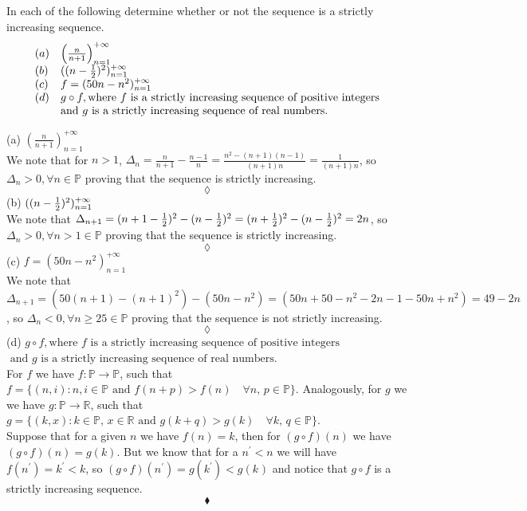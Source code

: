 \subsection{}
\begin{tcolorbox}
 In each of the following determine whether or not the sequence is a strictly increasing sequence.
\begin{align*}
\begin{array}{ll}
 (a)&\left(\frac{n}{n+1}\right)^{+\infty}_{n=1} \\
 (b) &((n -\frac{1}{2})^2)^{+\infty}_{n=1} \\
 (c)&f = (50n - n^2)^{+\infty}_{n=1} \\
 (d) &g \circ f, \text{where }f \text{ is a strictly increasing sequence of positive integers}\\
 &\text{and } g \text{ is a strictly increasing sequence of real numbers}. 
\end{array}
\end{align*}
\end{tcolorbox}
$$ $$
(a) $\left(\frac{n}{n+1}\right)^{+\infty}_{n=1}$ \\
We note that for $n>1$,  $\Delta_n= \frac{n}{n+1}- \frac{n-1}{n}= \frac{n^2-(n+1)(n-1)}{(n+1)n}= \frac{1}{(n+1)n}$, so $\Delta_n >0, \forall  n \in\mathbb{P}$ proving that the sequence is strictly increasing.
$$\lozenge$$
(b) $((n -\frac{1}{2})^2)^{+\infty}_{n=1}$ \\
We note that $\Delta_{n+1}= (n+1  -\frac{1}{2})^2- (n -\frac{1}{2})^2= (n  +\frac{1}{2})^2- (n -\frac{1}{2})^2= 2n $, so $\Delta_n > 0, \forall  n>1 \in\mathbb{P}$ proving that the sequence is strictly increasing.
$$\lozenge$$
(c) $f = (50n - n^2)^{+\infty}_{n=1}$ \\
We note that $\Delta_{n+1}= (50(n+1) - (n+1)^2)- (50n - n^2)=(50n+50 - n^2-2n-1-50n+ n^2)= 49-2n $, so $\Delta_n < 0, \forall  n\ge 25 \in\mathbb{P}$ proving that the sequence is not strictly increasing.
$$\lozenge$$
(d) $g \circ f, \text{where }f \text{ is a strictly increasing sequence of positive integers}$\\
$\text{      and } g \text{ is a strictly increasing sequence of real numbers}$. \\
For  $f$ we have $f:\mathbb{P}\rightarrow \mathbb{P} $, such that $f=\{(n,i): n,i \in \mathbb{P}\text{ and }f(n+p) > f(n)\quad \forall n,\,p \in\mathbb{P}\}$. Analogously, for  $g$ we we have $g:\mathbb{P}\rightarrow \mathbb{R} $, such that $g=\{(k,x): k\in \mathbb{P}, \,x \in \mathbb{R}\text{ and }g(k+q) > g(k)\quad \forall k,\, q\in\mathbb{P}\}$. \\
Suppose that for a given $n$ we have $f(n)=k$, then for $(g\circ f)(n)$ we have $(g\circ f)(n)=g(k)$. But we know that for a $n^{'}< n$ we will have $f(n^{'})=k^{'}<k$, so $(g\circ f)(n^{'})=g(k^{'})< g(k^{})$ and notice that $g\circ f$ is a strictly increasing sequence.
$$\blacklozenge$$

